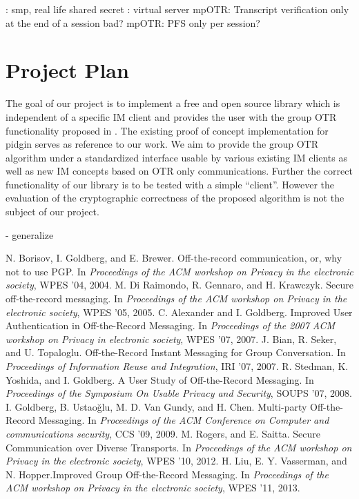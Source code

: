 \cite{auth-otr}: smp, real life shared secret
\cite{gotr}: virtual server
mpOTR: Transcript verification only at the end of a session bad?
mpOTR: PFS only per session?

\section{Project Plan}
The goal of our project is to implement a free and open source library which is independent of a specific IM client and provides the user with the group OTR functionality proposed in \cite{impr-gotr}. The existing proof of concept implementation for pidgin serves as reference to our work. We aim to provide the group OTR algorithm under a standardized interface usable by various existing IM clients as well as new IM concepts based on OTR only communications. Further the correct functionality of our library is to be tested with a simple “client”. However the evaluation of the cryptographic correctness of the proposed algorithm is not the subject of our project.

- generalize

\begin{thebibliography}{xx}

	 N. Borisov, I. Goldberg, and E. Brewer. Off-the-record
		communication, or, why not to use PGP. In \textit{Proceedings of the ACM
		workshop on Privacy in the electronic society}, WPES ’04, 2004.
	 M. Di Raimondo, R. Gennaro, and H. Krawczyk. Secure
		off-the-record messaging. In \textit{Proceedings of the ACM workshop on
		Privacy in the electronic society}, WPES ’05, 2005.
	 C. Alexander and I. Goldberg. Improved User
		Authentication in Off-the-Record Messaging. In \textit{Proceedings of
		the 2007 ACM workshop on Privacy in electronic society}, WPES ’07, 2007.
	 J. Bian, R. Seker, and U. Topaloglu. Off-the-Record Instant
		Messaging for Group Conversation. In \textit{Proceedings of Information
		Reuse and Integration}, IRI ’07, 2007.
	 R. Stedman, K. Yoshida, and I. Goldberg. A User Study
		of Off-the-Record Messaging. In \textit{Proceedings of the Symposium On
		Usable Privacy and Security}, SOUPS ’07, 2008.
	 I. Goldberg, B. Ustaoğlu, M. D. Van Gundy, and H. Chen.
		Multi-party Off-the-Record Messaging. In \textit{Proceedings of the ACM
		Conference on Computer and communications security}, CCS ’09, 2009.
	 M. Rogers, and E. Saitta. Secure Communication over
		Diverse Transports. In \textit{Proceedings of the ACM workshop on
		Privacy in the electronic society}, WPES ’10, 2012.
	 H. Liu, E. Y. Vasserman, and N. Hopper.Improved Group
		Off-the-Record Messaging. In \textit{Proceedings of the ACM workshop on
		Privacy in the electronic society}, WPES ’11, 2013.
\end{thebibliography}


